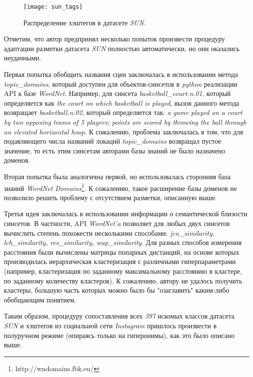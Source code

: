 \begin{figure}[h!]
    \begin{center}
   	    \texttt{[image: sun\_tags]}
   	\end{center}
   	\caption{Распределение хэштегов в датасете \textit{SUN}.}
   	\label{tikzpicture: sun_tags}
\end{figure}


\indent
\indent 
Отметим, что автор предпринял несколько попыток произвести процедуру 
адаптации разметки датасета \textit{SUN} полностью автоматически, 
но они оказались неудачными. 


\indent
\indent
Первая попытка обобщить названия сцен заключалась в использовании
метода \textit{topic\_domains},
который доступен для объектов-синсетов в \textit{python} реализации API к 
базе \textit{WordNet}. Например, для синсета
\textit{basketball\_court.n.01}, который определяется как 
\textit{the court on which basketball is played}, 
вызов данного метода возвращает \textit{basketball.n.02}, который определяется так:
\textit{a game played on a court by two opposing teams of 5 players;
points are scored by throwing the ball through an elevated horizontal hoop}.
К сожалению, проблема заключалась в том, что для подавляющего числа названий 
локаций \textit{topic\_domains} возвращал пустое значение,
то есть этим синсетам
авторами базы знаний не было назначено доменов.


\indent
\indent
Вторая попытка была аналогична первой, но использовалась сторонняя база знаний
\textit{WordNet Domains}\footnote{http://wndomains.fbk.eu/}. К сожалению, такое
расширение базы доменов не позволило решить проблему
с отсутствием разметки, описанную выше.


\indent
\indent
Третья идея заключалась в использовании информации о семантической близости 
синсетов. В частности, API \textit{WordNet'a} позволяет для любых двух синсетов
вычислить степень похожести несколькими способами:
\textit{jcn\_similarity, lch\_similarity, res\_similarity, wup\_similarity}.
Для разных способов измерения расстояния были вычислены матрицы попарных дистанций,
на основе которых производилась иерархическая кластеризация с различными
гиперпараметрами
 (например, кластеризация по заданному максимальному расстоянию в кластере, 
по заданному количеству кластеров). К сожалению, автору не удалось получить кластеры,
большую часть которых можно было бы "озаглавить" 
каким-либо обобщающим понятием.


\indent
\indent
Таким образом, процедуру сопоставления всех 
\textit{397} искомых классов датасета \textit{SUN} и хэштегов из социальной сети \textit{Instagram}
пришлось произвести в полуручном режиме (опираясь только на гиперонимы),
как это было описано выше.


